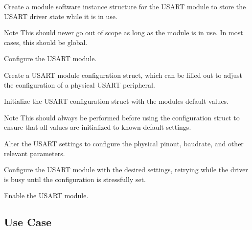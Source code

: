 \begin{DoxyEnumerate}
\item Create a module software instance structure for the U\+S\+A\+RT module to store the U\+S\+A\+RT driver state while it is in use. 
\begin{DoxyCodeInclude}{0}
\end{DoxyCodeInclude}
 \begin{DoxyNote}{Note}
This should never go out of scope as long as the module is in use. In most cases, this should be global.
\end{DoxyNote}

\item Configure the U\+S\+A\+RT module.
\begin{DoxyEnumerate}
\item Create a U\+S\+A\+RT module configuration struct, which can be filled out to adjust the configuration of a physical U\+S\+A\+RT peripheral. 
\begin{DoxyCodeInclude}{0}
\end{DoxyCodeInclude}

\item Initialize the U\+S\+A\+RT configuration struct with the module\textquotesingle{}s default values. 
\begin{DoxyCodeInclude}{0}
\end{DoxyCodeInclude}
 \begin{DoxyNote}{Note}
This should always be performed before using the configuration struct to ensure that all values are initialized to known default settings.
\end{DoxyNote}

\item Alter the U\+S\+A\+RT settings to configure the physical pinout, baudrate, and other relevant parameters. 
\begin{DoxyCodeInclude}{0}
\end{DoxyCodeInclude}

\item Configure the U\+S\+A\+RT module with the desired settings, retrying while the driver is busy until the configuration is stressfully set. 
\begin{DoxyCodeInclude}{0}
\end{DoxyCodeInclude}

\item Enable the U\+S\+A\+RT module. 
\begin{DoxyCodeInclude}{0}
\end{DoxyCodeInclude}

\end{DoxyEnumerate}
\end{DoxyEnumerate}\hypertarget{asfdoc_sam0_sercom_usart_basic_use_case_asfdoc_sam0_usart_basic_use_case_main}{}\subsection{Use Case}\label{asfdoc_sam0_sercom_usart_basic_use_case_asfdoc_sam0_usart_basic_use_case_main}
